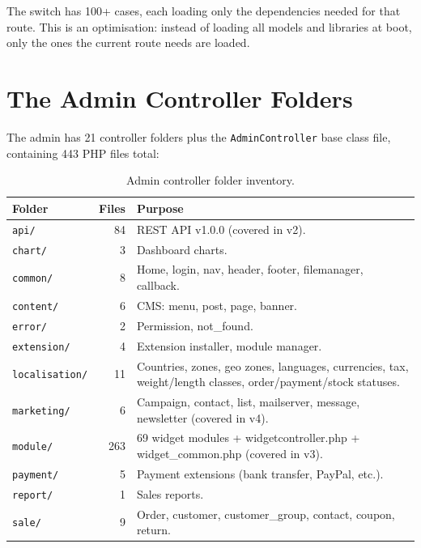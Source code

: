 \documentclass[11pt,a4paper]{article}
\begin{document}
The switch has 100+ cases, each loading only the dependencies needed
for that route. This is an optimisation: instead of loading all models
and libraries at boot, only the ones the current route needs are
loaded.

\section{The Admin Controller Folders}\label{sec:admin-folders}

The admin has 21 controller folders plus the \texttt{AdminController} base class file, containing 443 PHP files total:

\begin{table}[htbp]
\centering
\caption{Admin controller folder inventory.}\label{tab:admin-folders}
\footnotesize\sloppy
\begin{tabularx}{\columnwidth}{lrX}
\toprule
\textbf{Folder} & \textbf{Files} & \textbf{Purpose} \\
\midrule
\texttt{api/}           & 84  & REST API v1.0.0 (covered in v2). \\
\texttt{chart/}         & 3   & Dashboard charts. \\
\texttt{common/}        & 8   & Home, login, nav, header, footer, filemanager, callback. \\
\texttt{content/}       & 6   & CMS: menu, post, page, banner. \\
\texttt{error/}         & 2   & Permission, not\_found. \\
\texttt{extension/}     & 4   & Extension installer, module manager. \\
\texttt{localisation/}  & 11  & Countries, zones, geo zones, languages, currencies, tax, weight/length classes, order/payment/stock statuses. \\
\texttt{marketing/}     & 6   & Campaign, contact, list, mailserver, message, newsletter (covered in v4). \\
\texttt{module/}        & 263 & 69 widget modules + widgetcontroller.php + widget\_common.php (covered in v3). \\
\texttt{payment/}       & 5   & Payment extensions (bank transfer, PayPal, etc.). \\
\texttt{report/}        & 1   & Sales reports. \\
\texttt{sale/}          & 9   & Order, customer, customer\_group, contact, coupon, return. \\

\end{tabularx}
\end{table}
\end{document}
